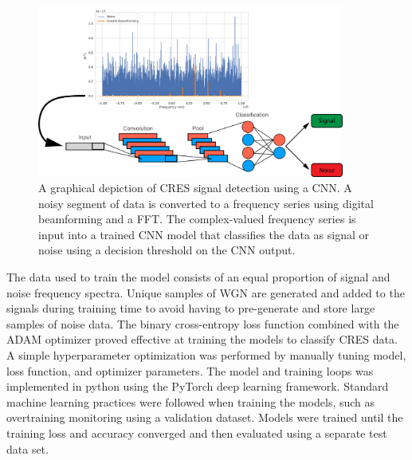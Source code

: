 \begin{figure}[htbp]
    \centering
    \includegraphics*[width=0.9\textwidth]{figs/Chapter-4/230727_deep_filter_process.png}
    \caption{\label{fig:chap4-deepfilter-process} A graphical depiction of CRES signal detection using a CNN. A noisy segment of data is converted to a frequency series using digital beamforming and a FFT. The complex-valued frequency series is input into a trained CNN model that classifies the data as signal or noise using a decision threshold on the CNN output. }
\end{figure}

The data used to train the model consists of an equal proportion of signal and noise frequency spectra. Unique samples of WGN are generated and added to the signals during training time to avoid having to pre-generate and store large samples of noise data. The binary cross-entropy loss function combined with the ADAM optimizer proved effective at training the models to classify CRES data. A simple hyperparameter optimization was performed by manually tuning model, loss function, and optimizer parameters. The model and training loops was implemented in python using the PyTorch deep learning framework. Standard machine learning practices were followed when training the models, such as overtraining monitoring using a validation dataset. Models were trained until the training loss and accuracy converged and then evaluated using a separate test data set.

